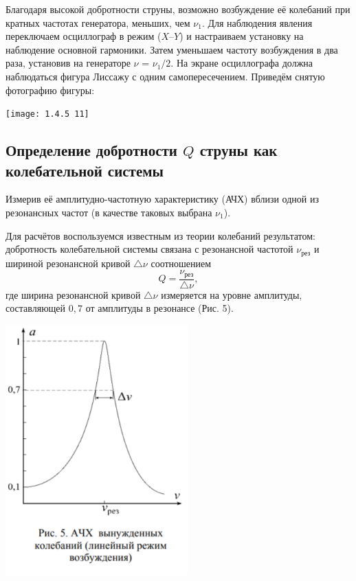 \documentclass[a4paper, 12pt]{article} %
\begin{document}
Благодаря высокой добротности струны, возможно возбуждение её
колебаний при кратных частотах генератора, меньших, чем $\nu_1$. Для наблюдения явления переключаем осциллограф в режим ($X$--$Y$) и настраиваем установку
на наблюдение основной гармоники. Затем уменьшаем частоту возбуждения
в два раза, установив на генераторе $\nu$ = $\nu_1/2$. На экране осциллографа должна
наблюдаться фигура Лиссажу с одним самопересечением. Приведём снятую фотографию фигуры:

\begin{center}
    \texttt{[image: 1.4.5 11]}
\end{center}

\subsection{Определение добротности $Q$ струны как колебательной системы}

Измерив её амплитудно-частотную характеристику (АЧХ) вблизи одной из резонансных частот (в качестве таковых выбрана $\nu_1$).

Для расчётов воспользуемся известным из теории колебаний результатом:
добротность колебательной системы связана с резонансной частотой $\nu_{\textbf{рез}}$ и шириной резонансной кривой $\bigtriangleup \nu$ соотношением \[ Q = \frac{\nu_{\textbf{рез}}}{\bigtriangleup \nu} , \]
где ширина резонансной кривой $\bigtriangleup \nu$ измеряется на уровне амплитуды, составляющей $0,7$ от амплитуды в резонансе
(Рис. 5).

\begin{center}
    \includegraphics[width=7cm]{1.4.5 6}
\end{center}
\end{document}

